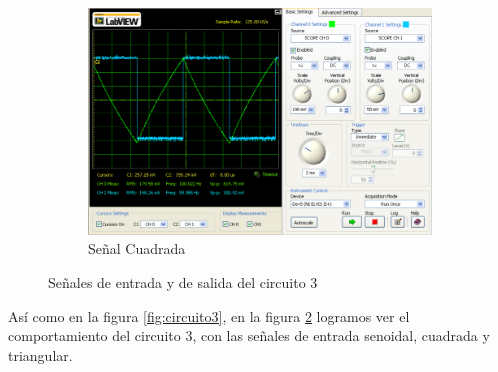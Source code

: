 \documentclass[]{article}
\begin{document}
\begin{figure}[h!]
\begin{subfigure}[b]{0.45\textwidth}
	\end{subfigure}
	~ 
	\begin{subfigure}[b]{0.45\textwidth}
		\includegraphics[width=\textwidth]{Imagenes/circuito3Cuadrada.png}
		\caption{Señal Cuadrada}
		\label{fig:circuito3cuadrada}
	\end{subfigure}
	
	\caption{Señales de entrada y de salida del circuito 3}\label{fig:circuito3Signals}
	
\end{figure}

Así como en la figura \ref{fig:circuito3}, en la figura \ref{fig:circuito3Signals} logramos ver el comportamiento del circuito 3, con las señales de entrada senoidal, cuadrada y triangular.\\
\end{document}
